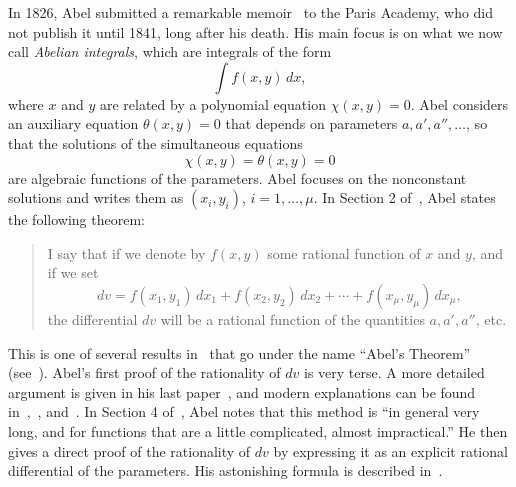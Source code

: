 \documentclass{amsart}
\theoremstyle{definition}
\numberwithin{equation}{section}
\numberwithin{thm}{section}
\begin{document}
In 1826, Abel submitted a remarkable memoir~\cite{Abel1} to the Paris Academy, who did not publish it until 1841, long after his death. His main focus is on what we now call \textit{Abelian integrals}, which are integrals of the form
\[
\int \!f(x,y)\,dx,
\]
where $x$ and $y$ are related by a polynomial equation $\chi(x,y) = 0$.   Abel considers an auxiliary equation $\theta(x,y) = 0$ that depends on parameters $a, a', a'', \dots$, so that the solutions of the simultaneous equations
\[
\chi(x,y) = \theta(x,y) = 0
\]
are algebraic functions of the parameters.  Abel focuses on the nonconstant solutions and writes them as  $(x_i,y_i)$, $i = 1,\dots,\mu$.  In Section 2 of~\cite{Abel1}, Abel states the following theorem:
\begin{quote}
	I say that if we denote by $f(x,y)$ some rational function of $x$ and $y$, and if we set
	\[
	dv = f(x_1,y_1)\,dx_1 +  f(x_2,y_2)\,dx_2 + \cdots +  f(x_\mu,y_\mu)\,dx_\mu,
	\]
	the differential $dv$ will be a rational function of the quantities $a, a', a''$, etc.
\end{quote}
This is one of several results in~\cite{Abel1} that go under the name ``Abel's Theorem'' (see~\cite{Kleiman}).  Abel's first proof of the rationality of $dv$  is very terse.  A more detailed argument is given in his last paper~\cite{Abel2}, and modern explanations can be found in~\cite{Cox2024},~\cite[Ch.\ 9]{Edwards}, and~\cite{Griffiths1976}.  In Section 4 of~\cite{Abel1}, Abel notes that this method is ``in general very long, and for functions that are a little complicated, almost impractical.'' He then gives a direct proof of the rationality of $dv$ by expressing it as an explicit rational differential of the parameters.  His astonishing formula is described in~\cite{Cox2024}.
\end{document}
